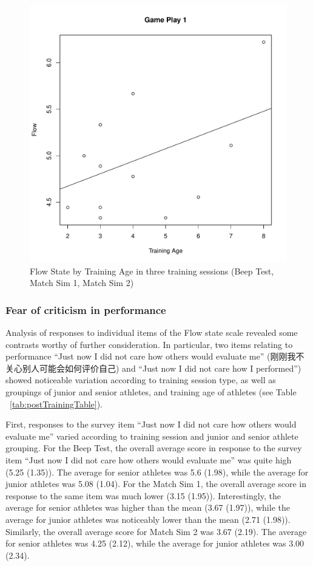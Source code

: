 \begin{CJK}{UTF8}{gbsn}
\begin{figure}[htbp]
\includegraphics[scale=.2]{images/flow0109TrainingAge.pdf}
  \caption{Flow State by Training Age in three training sessions (Beep Test, Match Sim 1, Match Sim 2)}
  \label{fig:flowTrainingAge}
\end{figure}

\subsubsection{Fear of criticism in performance}
Analysis of responses to individual items of the Flow state scale revealed some contrasts worthy of further consideration.  In particular, two items relating to performance ``Just now I did not care how others would evaluate me'' (刚刚我不关心别人可能会如何评价自己) and ``Just now I did not care how I performed'') showed noticeable variation according to training session type, as well as groupings of junior and senior athletes, and training age of athletes (see Table ~\ref{tab:postTrainingTable}).

First, responses to the survey item ``Just now I did not care how others would evaluate me'' varied according to training session and junior and senior athlete grouping. For the Beep Test, the overall average score in response to the survey item ``Just now I did not care how others would evaluate me'' was quite high (5.25 (1.35)).  The average for senior athletes was 5.6 (1.98), while the average for junior athletes was 5.08 (1.04). For the Match Sim 1, the overall average score in response to the same item was much lower (3.15 (1.95)). Interestingly, the average for senior athletes was higher than the mean (3.67 (1.97)), while the average for junior athletes was noticeably lower than the mean (2.71 (1.98)).  Similarly, the overall average score for Match Sim 2 was 3.67 (2.19).  The average for senior athletes was 4.25 (2.12), while the average for junior athletes was 3.00 (2.34).


\end{CJK}
